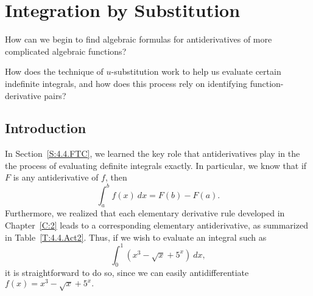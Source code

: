 \section{Integration by Substitution} \label{S:5.3.Substitution}

\begin{goals}
\item How can we begin to find algebraic formulas for antiderivatives of more complicated algebraic functions?
\item How does the technique of $u$-substitution work to help us evaluate certain indefinite integrals, and how does this process rely on identifying function-derivative pairs?
\end{goals}

\subsection*{Introduction}

In Section~\ref{S:4.4.FTC}, we learned the key role that antiderivatives play in the the process of evaluating definite integrals exactly.  In particular, we know that if $F$ is any antiderivative of $f$, then
\[ \int_a^b f(x) \ dx = F(b) - F(a). \]
Furthermore, we realized that each elementary derivative rule developed in Chapter~\ref{C:2} leads to a corresponding elementary antiderivative, as summarized in Table~\ref{T:4.4.Act2}.  Thus, if we wish to evaluate an integral such as 
\[ \int_0^1 \left(x^3 - \sqrt{x} + 5^x \right) \ dx, \]
it is straightforward to do so, since we can easily antidifferentiate $f(x) = x^3 - \sqrt{x} + 5^x.$ 


